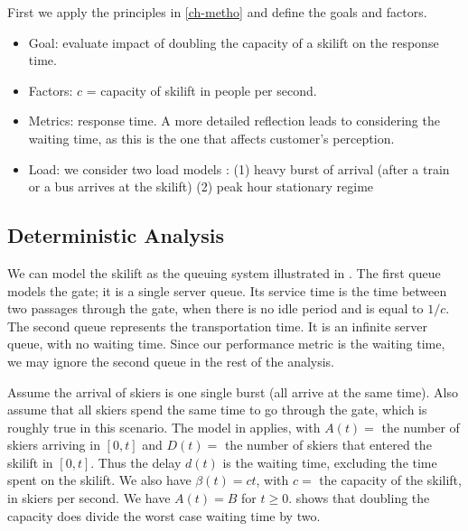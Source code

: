 First we apply the principles in \cref{ch-metho}
and define the goals and factors.
\begin{itemize}
  \item Goal: evaluate impact of doubling the capacity of a
  skilift on the response
  time.
  \item Factors: $c$ = capacity of skilift in people per
  second.
  \item Metrics: response time. A more detailed reflection
  leads to considering the waiting time, as this is the one
  that affects customer's perception. %
  \item Load: we consider two load models : (1) heavy burst of
  arrival (after a train or a bus arrives at the skilift) (2) peak hour stationary regime
\end{itemize}

\subsection{Deterministic Analysis}
We can model the skilift as the queuing system
illustrated in . The first
queue models the gate; it is a single server
queue. Its service time is the time between two
passages through the gate, when there is no idle
period and is equal to $1/c$. The second queue
represents the transportation time. It is an
infinite server queue, with no waiting time.
Since our performance metric is the waiting time,
we may ignore the second queue in the rest of the
analysis.
\begin{figure}[!htbp]
\end{figure}

\begin{figure}[!htbp]
\end{figure}

Assume the arrival of skiers is one single burst
(all arrive at the same time). Also assume that
all skiers spend the same time to go through the
gate, which is roughly true in this scenario. The
model in  applies, with $A(t)=$
the number of skiers arriving in $[0,t]$ and
$D(t)=$ the number of skiers that entered the
skilift in $[0,t]$. Thus the delay $d(t)$ is the
waiting time, excluding the time spent on the
skilift. We also have $\beta(t)=ct$, with $c=$
the capacity of the skilift, in skiers per
second. We have $A(t)=B$ for $t \geq 0$.
 shows that doubling the capacity
does divide the worst case waiting time by two.


